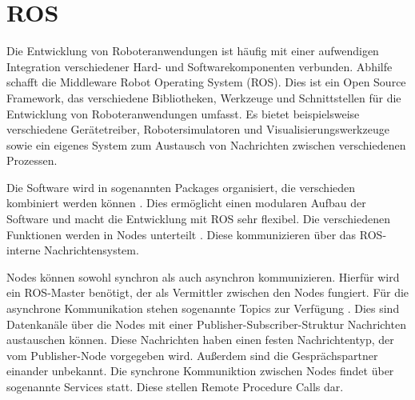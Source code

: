 %
%



\section[ROS (Kopp)]{ROS}

Die Entwicklung von Roboteranwendungen ist häufig mit einer aufwendigen Integration verschiedener Hard- und Softwarekomponenten verbunden. Abhilfe schafft die Middleware Robot Operating System (ROS). Dies ist ein Open Source Framework, das verschiedene Bibliotheken, Werkzeuge und Schnittstellen für die Entwicklung von Roboteranwendungen umfasst. Es bietet beispielsweise verschiedene Gerätetreiber, Robotersimulatoren und Visualisierungswerkzeuge sowie ein eigenes System zum Austausch von Nachrichten zwischen verschiedenen Prozessen. 

Die Software wird in sogenannten Packages organisiert, die verschieden kombiniert werden können \cite{rospackage2019}. Dies ermöglicht einen modularen Aufbau der Software und macht die Entwicklung mit ROS sehr flexibel. Die verschiedenen Funktionen werden in Nodes unterteilt \cite{rosnodes2018}. Diese kommunizieren über das ROS-interne Nachrichtensystem. 

Nodes können sowohl synchron als auch asynchron kommunizieren. Hierfür wird ein ROS-Master benötigt, der als Vermittler zwischen den Nodes fungiert. Für die asynchrone Kommunikation stehen sogenannte Topics zur Verfügung \cite{rostopics2019}. Dies sind Datenkanäle über die Nodes mit einer Publisher-Subscriber-Struktur Nachrichten austauschen können. Diese Nachrichten haben einen festen Nachrichtentyp, der vom Publisher-Node vorgegeben wird. Außerdem sind die Gesprächspartner einander unbekannt. Die synchrone Kommuniktion zwischen Nodes findet über sogenannte Services statt. Diese stellen Remote Procedure Calls dar. 

